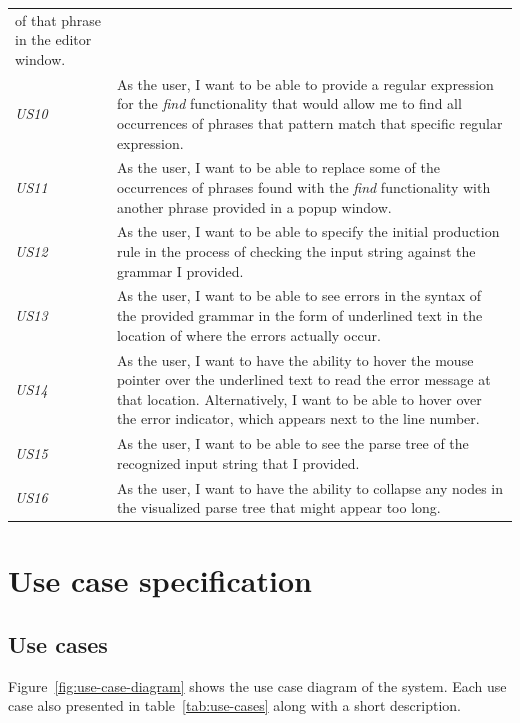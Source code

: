 \documentclass[english,engineering]{wizthesis}
\begin{document}
\begin{xltabular}{\textwidth}{@{}lX@{}}
  of that phrase in the editor window. \\
  \addlinespace[0.5em] \emph{US10} & As the user, I want to be able to provide a
  regular expression for the \emph{find} functionality that would allow me to
  find all occurrences of phrases that pattern match that specific regular
  expression. \\
  \addlinespace[0.5em] \emph{US11} & As the user, I want to be able to replace
  some of the occurrences of phrases found with the \emph{find} functionality
  with another phrase provided in a popup window. \\
  \addlinespace[0.5em] \emph{US12} & As the user, I want to be able to specify
  the initial production rule in the process of checking the input string
  against the grammar I provided. \\
  \addlinespace[0.5em] \emph{US13} & As the user, I want to be able to see
  errors in the syntax of the provided grammar in the form of underlined text in
  the location of where the errors actually occur. \\
  \addlinespace[0.5em] \emph{US14} & As the user, I want to have the ability to
  hover the mouse pointer over the underlined text to read the error message at
  that location. Alternatively, I want to be able to hover over the error
  indicator, which appears next to the line number. \\
  \addlinespace[0.5em] \emph{US15} & As the user, I want to be able to see the
  parse tree of the recognized input string that I provided. \\
  \addlinespace[0.5em] \emph{US16} & As the user, I want to have the ability to
  collapse any nodes in the visualized parse tree that might appear too long.
  \\* \bottomrule
\end{xltabular}

\section{Use case specification} \label{sec:use-case-specification}

\subsection{Use cases} \label{sbs:use-cases}

Figure~\ref{fig:use-case-diagram} shows the use case diagram of the system. Each
use case also presented in table~\ref{tab:use-cases} along with a short
description.
\end{document}
